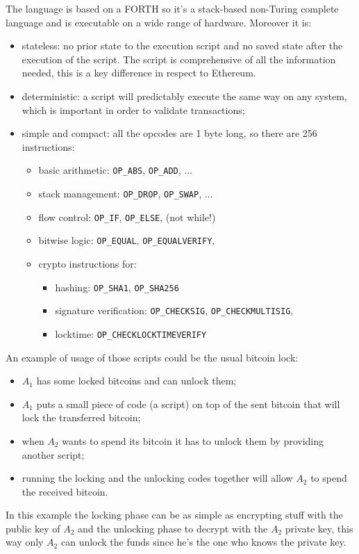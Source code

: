 The language is based on a FORTH so it's a stack-based non-Turing complete language and is executable on a wide range of hardware.
Moreover it is:
\begin{itemize}
    \item stateless: no prior state to the execution script and no saved state after the execution of the script.
    The script is comprehensive of all the information needed, this is a key difference in respect to Ethereum.

    \item deterministic: a script will predictably execute the same way on any system, which is important in order to validate transactions;

    \item simple and compact: all the opcodes are 1 byte long, so there are 256 instructions:
    \begin{itemize}
        \item basic arithmetic: \verb|OP_ABS|, \verb|OP_ADD|, ...
        \item stack management: \verb|OP_DROP|, \verb|OP_SWAP|, ...
        \item flow control: \verb|OP_IF|, \verb|OP_ELSE|, (not while!)
        \item bitwise logic: \verb|OP_EQUAL|, \verb|OP_EQUALVERIFY|,
        \item crypto instructions for:
        \begin{itemize}
            \item hashing: \verb|OP_SHA1|, \verb|OP_SHA256|
            \item signature verification: \verb|OP_CHECKSIG|, \verb|OP_CHECKMULTISIG|,
            \item locktime: \verb|OP_CHECKLOCKTIMEVERIFY|
        \end{itemize}
    \end{itemize}
\end{itemize}

An example of usage of those scripts could be the usual bitcoin lock:
\begin{itemize}
    \item $A_1$ has some locked bitcoins and can unlock them;
    \item $A_1$ puts a small piece of code (a script) on top of the sent bitcoin that will lock the transferred bitcoin;
    \item when $A_2$ wants to spend its bitcoin it has to unlock them by providing another script;
    \item running the locking and the unlocking codes together will allow $A_2$ to spend the received bitcoin.
\end{itemize}
In this example the locking phase can be as simple as encrypting stuff with the public key of $A_2$ and the unlocking phase to decrypt with the $A_2$ private key, this way only $A_2$ can unlock the funds since he's the one who knows the private key.

